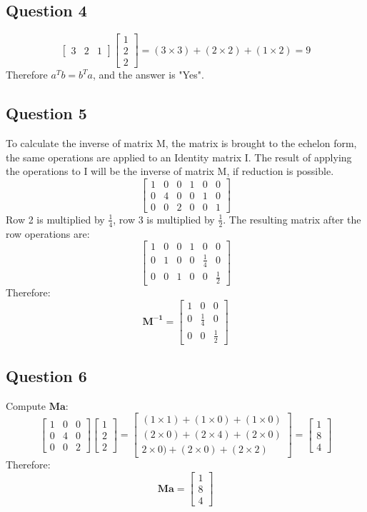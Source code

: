 \documentclass{article}
\begin{document}
\subsection{Question 4}
$$
\begin{bmatrix}
3 & 2 & 1\end{bmatrix}
\begin{bmatrix}
1\\
2\\
2 \end{bmatrix}
= (3 \times 3) + ( 2 \times 2) + (1 \times 2) = 9
$$
Therefore $a^Tb = b^Ta$, and the answer is "Yes". 
\subsection{Question 5}
To calculate the inverse of matrix M, the matrix is brought to the echelon form, the same operations are applied to an Identity matrix I. The result of applying the operations to I will be the inverse of matrix M, if reduction is possible.
$$
\left[\begin{array}{rrr|rrr}
1&0&0&1&0&0\\
0&4&0&0&1&0\\
0&0&2&0&0&1
\end{array}\right]
$$
Row 2 is multiplied by $\frac{1}{4}$, row 3 is multiplied by $\frac{1}{2}$. The resulting matrix after the row operations are:
$$
\left[\begin{array}{rrr|rrr}
1&0&0&1&0&0\\
0&1&0&0& \frac{1}{4} &0\\
0&0&1&0&0&\frac{1}{2}
\end{array}\right]
$$
Therefore:
$$
\mathbf{M^{-1}} =
\begin{bmatrix}
1 & 0 & 0 \\
0 & \frac{1}{4} & 0 \\
0 & 0 & \frac{1}{2}
\end{bmatrix}
$$
\subsection{Question 6}
Compute $ \textbf{Ma}$:
$$
\begin{bmatrix}
1 & 0 & 0 \\
0 & 4 & 0 \\
0 & 0 & 2
\end{bmatrix}
\begin{bmatrix}
1 \\
2 \\
2
\end{bmatrix}
=
\begin{bmatrix}
(1 \times 1) + (1 \times 0) + (1 \times 0) \\
(2 \times 0) + (2 \times 4) + (2 \times 0)  \\
2 \times 0)  + (2\times 0) + (2 \times 2) 
\end{bmatrix}
=
\begin{bmatrix}
1 \\
8 \\
4
\end{bmatrix}
$$
Therefore:
$$
\textbf{Ma} =
\begin{bmatrix}
1 \\
8 \\
4
\end{bmatrix}
$$
\end{document}
